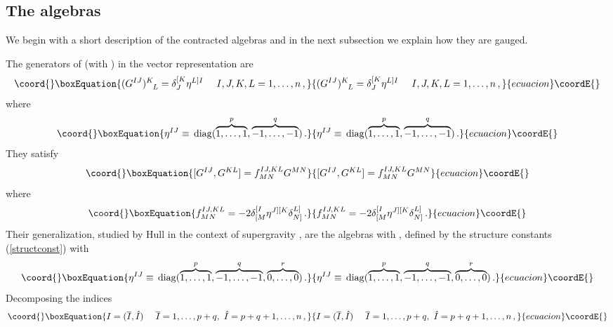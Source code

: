 \documentclass[a4paper,12pt]{article}
\def\bar{\overline}\end {picture}}
\begin{document}
\subsection{The \coordHE{} algebras}
We begin with a short description of the contracted algebras and
in the next subsection we explain how they are gauged.
\par
The generators of \coordHE{} (with \coordHE{}) in the vector
representation are
\begin{equation}\coord{}\boxEquation{
(G^{IJ})^K_{~~L}=\delta^{[K}_J\eta^{L]I}~~~~I,J,K,L=1,\dots,n\,,
}{
(G^{IJ})^K_{~~L}=\delta^{[K}_J\eta^{L]I}~~~~I,J,K,L=1,\dots,n\,,
}{ecuacion}\coordE{}\end{equation}
where
\begin{equation}\coord{}\boxEquation{
\eta^{IJ}\equiv\,{\rm
diag}(\overbrace{1,\dots,1}^p,\overbrace{-1,\dots,-1}^q)\,.
}{
\eta^{IJ}\equiv\,{\rm
diag}(\overbrace{1,\dots,1}^p,\overbrace{-1,\dots,-1}^q)\,.
}{ecuacion}\coordE{}\end{equation}
They satisfy
\begin{equation}\coord{}\boxEquation{
[G^{IJ},G^{KL}]=f^{IJ,KL}_{MN}G^{MN}
}{
[G^{IJ},G^{KL}]=f^{IJ,KL}_{MN}G^{MN}
}{ecuacion}\coordE{}\end{equation}
where
\begin{equation}\coord{}\boxEquation{
\label{structconst}
f^{IJ,KL}_{MN}=-2\delta^{[I}_{[M}\eta^{J][K}\delta^{L]}_{N]}\,.
}{
f^{IJ,KL}_{MN}=-2\delta^{[I}_{[M}\eta^{J][K}\delta^{L]}_{N]}\,.
}{ecuacion}\coordE{}\end{equation}
Their generalization, studied by Hull in the context of
supergravity \cite{hull},\cite{hull2} are the algebras
\coordHE{} with \coordHE{}, defined by the structure
constants (\ref{structconst}) with
\begin{equation}\coord{}\boxEquation{
\eta^{IJ}\equiv\,{\rm
diag}(\overbrace{1,\dots,1}^p,\overbrace{-1,\dots,-1}^q,
\overbrace{0,\dots,0}^r)\,. \label{metriccpqr}
}{
\eta^{IJ}\equiv\,{\rm
diag}(\overbrace{1,\dots,1}^p,\overbrace{-1,\dots,-1}^q,
\overbrace{0,\dots,0}^r)\,. }{ecuacion}\coordE{}\end{equation}
Decomposing the indices
\begin{equation}\coord{}\boxEquation{
I=(\bar{I},\hat{I})~~~~\bar{I}=1,\dots,p+q,~\hat{I}=p+q+1,\dots,n\,,
}{
I=(\bar{I},\hat{I})~~~~\bar{I}=1,\dots,p+q,~\hat{I}=p+q+1,\dots,n\,,
}{ecuacion}\coordE{}\end{equation}
\end{document}
